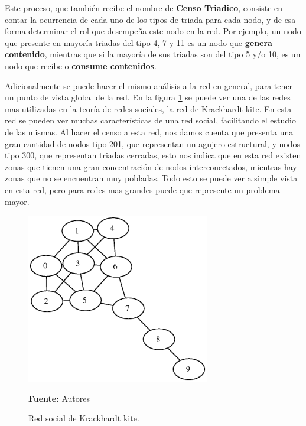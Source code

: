Este proceso, que también recibe el nombre de \textbf{Censo Triadico}, consiste en contar la ocurrencia de cada uno de los tipos de triada para cada nodo, y de esa forma determinar el rol que desempeña este nodo en la red. Por ejemplo, un nodo que presente en mayoría triadas del tipo 4, 7 y 11 es un nodo que \textbf{genera contenido}, mientras que si la mayoría de sus triadas son del tipo 5 y/o 10, es un nodo que recibe o \textbf{consume contenidos}.

Adicionalmente se puede hacer el mismo análisis a la red en general, para tener un punto de vista global de la red. En la figura \ref{fig:red_krackhardt} se puede ver una de las redes mas utilizadas en la teoría de redes sociales, la red de Krackhardt-kite. En esta red se pueden ver muchas características de una red social, facilitando el estudio de las mismas. Al hacer el censo a esta red, nos damos cuenta que presenta una gran cantidad de nodos tipo 201, que representan un agujero estructural, y nodos tipo 300, que representan triadas cerradas, esto nos indica que en esta red existen zonas que tienen una gran concentración de nodos interconectados, mientras hay zonas que no se encuentran muy pobladas. Todo esto se puede ver a simple vista en esta red, pero para redes mas grandes puede que represente un problema mayor.

\begin{figure}[!htb]
  \begin{center}
    \includegraphics[width=8cm]{./imagenes/red_krackhardt_kite.eps}
    \caption{Red social de Krackhardt kite.}
    \label{fig:red_krackhardt}
    \textbf{Fuente:}  Autores
  \end{center}
\end{figure}